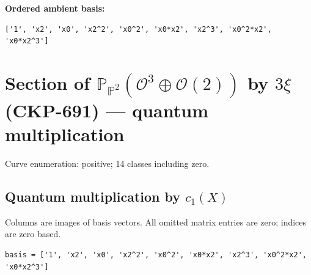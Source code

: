\documentclass[10pt,a4paper]{article}
\begin{document}
\textbf{Ordered ambient basis:}
\begin{lstlisting}
['1', 'x2', 'x0', 'x2^2', 'x0^2', 'x0*x2', 'x2^3', 'x0^2*x2', 'x0*x2^3']
\end{lstlisting}

\clearpage\section*{Section of $\mathbb P_{\mathbb P^{2}}(\mathcal O^{3}\oplus \mathcal O(2))$ by $3\xi $ (CKP-691) --- quantum multiplication}

Curve enumeration: positive; 14 classes including zero.
\subsection*{Quantum multiplication by $c_1(X)$}
Columns are images of basis vectors. All omitted matrix entries are zero; indices are zero based.

\begin{lstlisting}
basis = ['1', 'x2', 'x0', 'x2^2', 'x0^2', 'x0*x2', 'x2^3', 'x0^2*x2', 'x0*x2^3']
\end{lstlisting}
\end{document}
